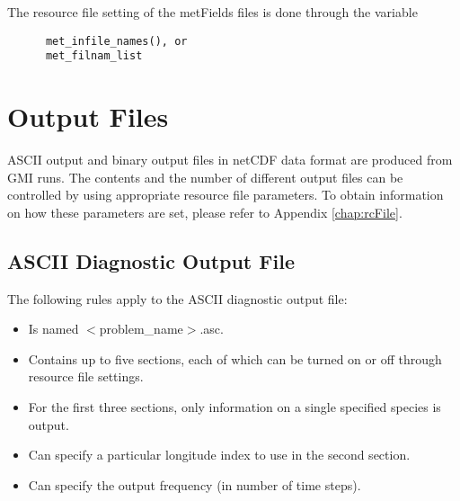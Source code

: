 %
The resource file setting of the metFields files is done through the variable
%
\begin{verbatim}
      met_infile_names(), or
      met_filnam_list
\end{verbatim}
%
%
\section{Output Files}
%
ASCII output and binary output files in netCDF data format are 
produced from GMI runs. 
The contents and the number of different output 
files can be controlled by using appropriate resource file parameters.  
To obtain information on how these parameters are set, please refer to
Appendix \ref{chap:rcFile}.
%
\subsection{ASCII Diagnostic Output File}
The following rules apply to the ASCII diagnostic output file:
\begin{itemize}
\item Is named $<$problem\_name$>$.asc.
\item Contains up to five sections, each of which can be turned on or off through 
      resource file settings.
\item For the first three sections, only information on a single specified
      species is output.
\item Can specify a particular longitude index to use in the second section.
\item Can specify the output frequency (in number of time steps).
\end{itemize}

